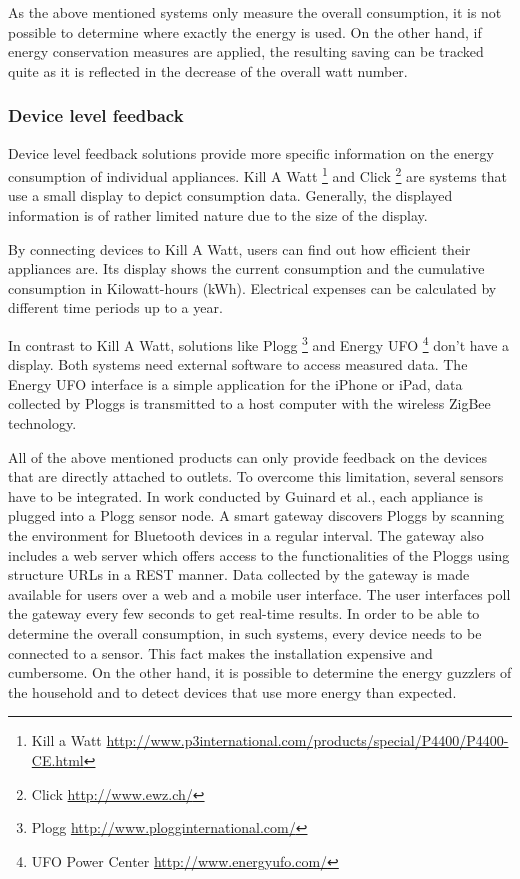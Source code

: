 As the above mentioned systems only measure the overall consumption, it is not possible to determine where exactly the energy is used. On the other hand, if energy conservation measures are applied, the resulting saving can be tracked quite as it is reflected in the decrease of the overall watt number.

\subsubsection{Device level feedback}
Device level feedback solutions provide more specific information on the energy consumption of individual appliances. Kill A Watt \footnote{Kill a Watt \url{http://www.p3international.com/products/special/P4400/P4400-CE.html}} and Click \footnote{Click \url{http://www.ewz.ch/}} are systems that use a small display to depict consumption data. Generally, the displayed information is of rather limited nature due to the size of the display.
 
By connecting devices to Kill A Watt, users can find out how efficient their appliances are. Its display shows the current consumption and the cumulative consumption in Kilowatt-hours (kWh). Electrical expenses can be calculated by different time periods up to a year. 

In contrast to Kill A Watt, solutions like Plogg \footnote{Plogg \url{http://www.plogginternational.com/}} and Energy UFO \footnote{UFO Power Center \url{http://www.energyufo.com/}} don't have a display. Both systems need external software to access measured data.
The Energy UFO interface is a simple application for the iPhone or iPad, data collected by Ploggs is transmitted to a host computer with the wireless ZigBee technology.  

All of the above mentioned products can only provide feedback on the devices that are directly attached to outlets. To overcome this limitation, several sensors have to be integrated. 
In work conducted by Guinard et al.\cite{weiss:inprocMUM:2010}, each appliance is plugged into a Plogg sensor node. A smart gateway discovers Ploggs by scanning the environment for Bluetooth devices in a regular interval. The gateway also includes a web server which offers access to the functionalities of the Ploggs using structure URLs in a REST manner. Data collected by the gateway is made available for users over a web and a mobile user interface. The user interfaces poll the gateway every few seconds to get real-time results.   	
In order to be able to determine the overall consumption, in such systems, every device needs to be connected to a sensor. This fact makes the installation expensive and cumbersome. 
On the other hand, it is possible to determine the energy guzzlers of the household and to detect devices that use more energy than expected.
